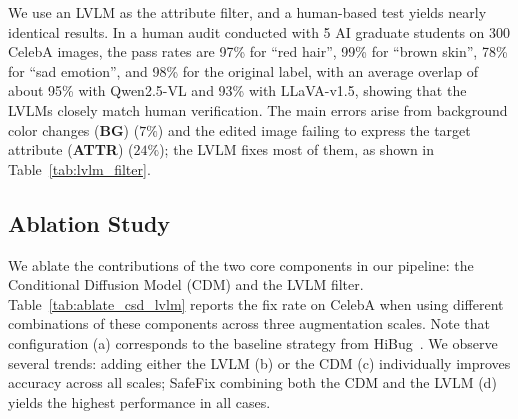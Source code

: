 \documentclass[10pt]{article} %
\newcommand{\model}{SafeFix\xspace}
\newcommand{\hibug}{HiBug\xspace}
\newcommand{\qwen}{Qwen2.5-VL\xspace}
\newcommand{\llava}{LLaVA-v1.5\xspace}
\begin{document}
We use an LVLM as the attribute filter, and a human-based test yields nearly identical results. In a human audit conducted with 5 AI graduate students on 300 CelebA images, the pass rates are 97\% for ``red hair'', 99\% for ``brown skin'', 78\% for ``sad emotion'', and 98\% for the original label, with an average overlap of about 95\% with \qwen{} and 93\% with \llava{}, showing that the LVLMs closely match human verification. The main errors arise from background color changes (\textbf{BG}) ($7\%$) and the edited image failing to express the target attribute (\textbf{ATTR}) ($24\%$); the LVLM fixes most of them, as shown in Table~\ref{tab:lvlm_filter}.

\subsection{Ablation Study}
\label{sec:ablation}

\begin{table}
  \vspace{-15pt}
  \centering
  \setlength{\tabcolsep}{4pt}
  \renewcommand{\arraystretch}{1.0}
  \small
  \caption{Ablation on the impact of CDM and LVLM components at different scales, reported as Fix Rate (FR \%).}
  \label{tab:ablate_csd_lvlm}
  \vspace{-10pt}
\end{table}

We ablate the contributions of the two core components in our pipeline: the Conditional Diffusion Model (CDM) and the LVLM filter. Table~\ref{tab:ablate_csd_lvlm} reports the fix rate on CelebA when using different combinations of these components across three augmentation scales. Note that configuration (a) corresponds to the baseline strategy from \hibug~\citep{chen2023hibug}. We observe several trends: adding either the LVLM (b) or the CDM (c) individually improves accuracy across all scales; \model combining both the CDM and the LVLM (d) yields the highest performance in all cases.
\end{document}
